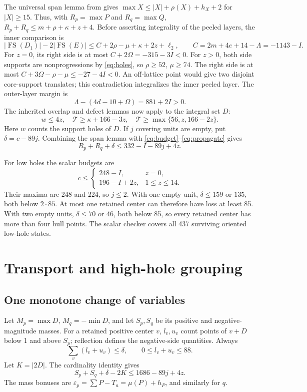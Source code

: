 \documentclass[11pt,a4paper]{article}
\newcommand{\FS}{\operatorname{FS}}
\newcommand{\T}{\mathcal T}
\begin{document}
The universal span lemma from \cite{previous} gives
$\max X\le |X|+\rho(X)+h_X+2$ for $|X|\ge15$.
Thus, with $R_p=\max P$ and $R_q=\max Q$,
$R_p+R_q\le m+\rho+\kappa+z+4$.
Before asserting integrality of the peeled layers, the inner comparison is
\[
 |\FS(D_1)|-2|\FS(E)|
 \le C+2\rho-\mu+\kappa+2z+\ell_2,
 \qquad C=2m+4e+14-\Lambda=-1143-I.
\]
For $z=0$, its right side is at most
$C+2\Omega=-315-3I<0$.
For $z>0$, both side supports are nonprogressions by \eqref{eq:holes},
so $\rho\ge52$, $\mu\ge74$. The right side is at most
$C+3\Omega-\rho-\mu\le-27-4I<0$.
An off-lattice point would give two disjoint core-support translates;
this contradiction integralizes the inner peeled layer. The outer-layer
margin is
\[
 \Lambda-(4d-10+\Omega)=881+2I>0.
\]
The inherited overlap and defect lemmas now apply to the integral set $D$:
\begin{equation}\label{eq:propagate}
 w\le4z,\quad \T\ge\kappa+166-3z,\quad
 \T\ge\max\{56,z,166-2z\}.
\end{equation}
Here $w$ counts the support holes of $D$.
If $j$ covering units are empty, put $\delta=c-89j$.
Combining the span lemma with \eqref{eq:budget}--\eqref{eq:propagate} gives
\begin{equation}\label{eq:span}
 R_p+R_q+\delta\le332-I-89j+4z.
\end{equation}

For low holes the scalar budgets are
\begin{equation}\label{eq:low}
 c\le\begin{cases}248-I,&z=0,\\196-I+2z,&1\le z\le14.\end{cases}
\end{equation}
Their maxima are 248 and 224, so $j\le2$.
With one empty unit, $\delta\le159$ or $135$, both below $2\cdot85$.
At most one retained center can therefore have loss at least 85.
With two empty units, $\delta\le70$ or $46$, both below 85, so every
retained center has more than four hull points. The scalar checker
covers all 437 surviving oriented low-hole states.

\section{Transport and high-hole grouping}
\subsection{One monotone change of variables}
Let $M_p=\max D$, $M_q=-\min D$, and let $S_p,S_q$ be its positive
and negative-magnitude masses. For a retained positive center $v$,
$l_v,u_v$ count points of $v+D$ below 1 and above $S_p$; reflection
defines the negative-side quantities. Always
\[
 \sum_v(l_v+u_v)\le\delta,\qquad 0\le l_v+u_v\le88.
\]
Let $K=|2D|$. The cardinality identity gives
\begin{equation}\label{eq:card}
 S_p+S_q+\delta-2K\le1686-89j+4z.
\end{equation}
The mass bonuses are
$\varepsilon_p=\sum P-T_a=\mu(P)+h_P$, and similarly for $q$.
\end{document}
